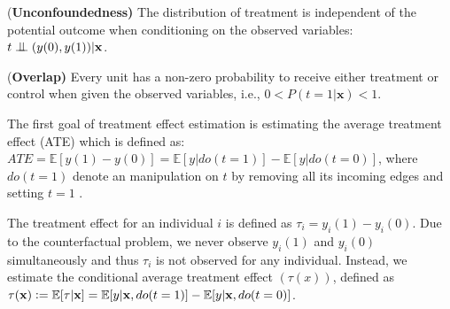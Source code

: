 \documentclass[letterpaper]{article} %
\newcommand{\bigCI}{\mathrel{\text{\scalebox{1.07}{$\perp\mkern-10mu\perp$}}}}
\begin{document}
\begin{assumption}
	(\textbf{Unconfoundedness)} The distribution of treatment is independent of the potential outcome when conditioning on the observed variables: $t \bigCI (y(0), y(1)) | \mathbf{x}$.
	\label{unconfound}
\end{assumption}

\begin{assumption}
	(\textbf{Overlap)} Every unit has a non-zero probability to receive either treatment or control when given the observed variables, i.e., $0< P(t=1|\mathbf{x})<1$.
	\label{overslap}
\end{assumption}

The first goal of treatment effect estimation is estimating the average treatment effect (ATE) which is defined as: $ATE = \mathbb{E}[y(1) - y(0)] = \mathbb{E}[y|do(t=1)] - \mathbb{E}[y|do(t=0)]$,
where $do(t=1)$ denote an manipulation on $t$ by removing all its incoming edges and setting $t=1$ \cite{Pearl2009}.

The treatment effect for an individual $i$ is defined as $\tau_i = y_i(1) - y_i(0)$.
Due to the counterfactual problem, we never observe $y_i(1)$ and $y_i(0)$ simultaneously and thus $\tau_i$ is not observed for any individual. Instead, we estimate the conditional average treatment effect $(\tau(x))$, defined as $\tau(\mathbf{x}) \vcentcolon = \mathbb{E}[\tau|\mathbf{x}] =  \mathbb{E}[y|\mathbf{x}, do(t=1)] - \mathbb{E}[y|\mathbf{x},do(t=0)]$.

\end{document}
